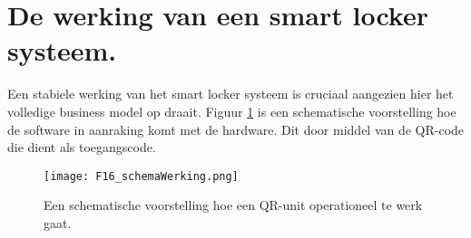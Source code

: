 \newpage

\section{De werking van een smart locker systeem.}%
\label{sec:WerkingUnits}

Een stabiele werking van het smart locker systeem is cruciaal aangezien hier het volledige business model op draait. Figuur \ref{fig:schemaWerkingUnit} is een schematische voorstelling hoe de software in aanraking komt met de hardware. Dit door middel van de QR-code die dient als toegangscode.

\begin{figure}[h]
    \centering
    \texttt{[image: F16\_schemaWerking.png]}
    \captionsetup{justification=ce/brntering, singlelinecheck=false}    
    \caption{Een schematische voorstelling  hoe een QR-unit operationeel te werk gaat.}
    \label{fig:schemaWerkingUnit}
\end{figure}

